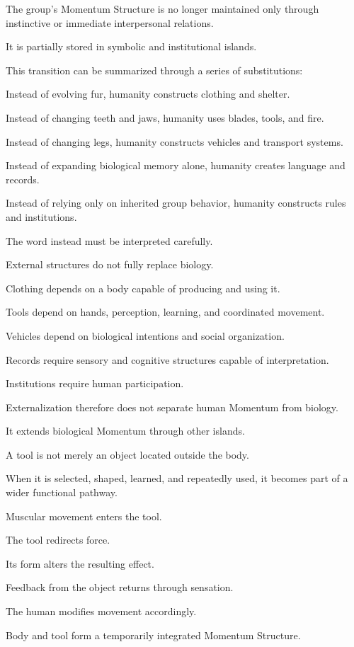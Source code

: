The group’s Momentum Structure is no longer maintained only through instinctive or immediate interpersonal relations.

It is partially stored in symbolic and institutional islands.

This transition can be summarized through a series of substitutions:

Instead of evolving fur, humanity constructs clothing and shelter.

Instead of changing teeth and jaws, humanity uses blades, tools, and fire.

Instead of changing legs, humanity constructs vehicles and transport systems.

Instead of expanding biological memory alone, humanity creates language and records.

Instead of relying only on inherited group behavior, humanity constructs rules and institutions.

The word instead must be interpreted carefully.

External structures do not fully replace biology.

Clothing depends on a body capable of producing and using it.

Tools depend on hands, perception, learning, and coordinated movement.

Vehicles depend on biological intentions and social organization.

Records require sensory and cognitive structures capable of interpretation.

Institutions require human participation.

Externalization therefore does not separate human Momentum from biology.

It extends biological Momentum through other islands.

A tool is not merely an object located outside the body.

When it is selected, shaped, learned, and repeatedly used, it becomes part of a wider functional pathway.

Muscular movement enters the tool.

The tool redirects force.

Its form alters the resulting effect.

Feedback from the object returns through sensation.

The human modifies movement accordingly.

Body and tool form a temporarily integrated Momentum Structure.

